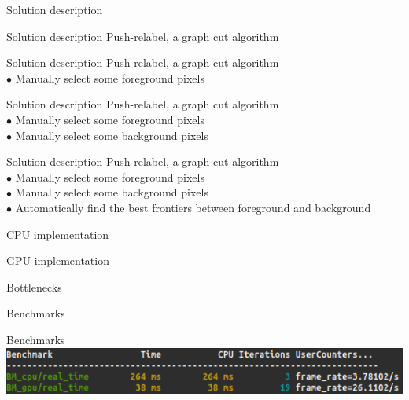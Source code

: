 \documentclass[10pt]{beamer}
\begin{document}
\begin{frame}{Solution description}
\end{frame}

\begin{frame}{Solution description}
Push-relabel, a graph cut algorithm
\end{frame}

\begin{frame}{Solution description}
Push-relabel, a graph cut algorithm\\
$\bullet$ Manually select some foreground pixels
\end{frame}

\begin{frame}{Solution description}
Push-relabel, a graph cut algorithm\\
$\bullet$ Manually select some foreground pixels\\
$\bullet$ Manually select some background pixels
\end{frame}

\begin{frame}{Solution description}
Push-relabel, a graph cut algorithm\\
$\bullet$ Manually select some foreground pixels\\
$\bullet$ Manually select some background pixels\\
$\bullet$ Automatically find the best frontiers between foreground and
background
\end{frame}

\begin{frame}{CPU implementation}
\end{frame}

\begin{frame}{GPU implementation}
\end{frame}

\begin{frame}{Bottlenecks}
\end{frame}

\begin{frame}{Benchmarks}
\end{frame}

\begin{frame}{Benchmarks}
    \includegraphics[width=1\textwidth]{../pics/benchmark02.png}
\end{frame}
\end{document}
